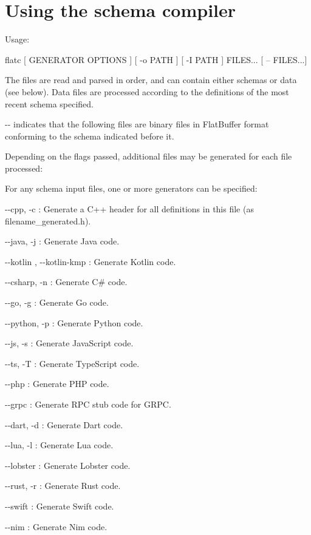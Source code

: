 \chapter{Using the schema compiler}
\hypertarget{flatbuffers_guide_using_schema_compiler}{}\label{flatbuffers_guide_using_schema_compiler}
Usage\+: \begin{DoxyVerb}flatc [ GENERATOR OPTIONS ] [ -o PATH ] [ -I PATH ] FILES...
      [ -- FILES...]
\end{DoxyVerb}
 The files are read and parsed in order, and can contain either schemas or data (see below). Data files are processed according to the definitions of the most recent schema specified.

{\ttfamily -\/-\/} indicates that the following files are binary files in Flat\+Buffer format conforming to the schema indicated before it.

Depending on the flags passed, additional files may be generated for each file processed\+:

For any schema input files, one or more generators can be specified\+:


\begin{DoxyItemize}
\item {\ttfamily -\/-\/cpp}, {\ttfamily -\/c} \+: Generate a C++ header for all definitions in this file (as {\ttfamily filename\+\_\+generated.\+h}).
\item {\ttfamily -\/-\/java}, {\ttfamily -\/j} \+: Generate Java code.
\item {\ttfamily -\/-\/kotlin} , {\ttfamily -\/-\/kotlin-\/kmp} \+: Generate Kotlin code.
\item {\ttfamily -\/-\/csharp}, {\ttfamily -\/n} \+: Generate C\# code.
\item {\ttfamily -\/-\/go}, {\ttfamily -\/g} \+: Generate Go code.
\item {\ttfamily -\/-\/python}, {\ttfamily -\/p} \+: Generate Python code.
\item {\ttfamily -\/-\/js}, {\ttfamily -\/s} \+: Generate Java\+Script code.
\item {\ttfamily -\/-\/ts}, {\ttfamily -\/T} \+: Generate Type\+Script code.
\item {\ttfamily -\/-\/php} \+: Generate PHP code.
\item {\ttfamily -\/-\/grpc} \+: Generate RPC stub code for GRPC.
\item {\ttfamily -\/-\/dart}, {\ttfamily -\/d} \+: Generate Dart code.
\item {\ttfamily -\/-\/lua}, {\ttfamily -\/l} \+: Generate Lua code.
\item {\ttfamily -\/-\/lobster} \+: Generate Lobster code.
\item {\ttfamily -\/-\/rust}, {\ttfamily -\/r} \+: Generate Rust code.
\item {\ttfamily -\/-\/swift} \+: Generate Swift code.
\item {\ttfamily -\/-\/nim} \+: Generate Nim code.
\end{DoxyItemize}

